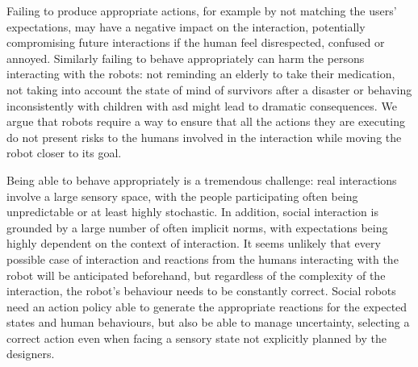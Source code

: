     Failing to produce appropriate actions, for example by not matching the users' expectations, may have a negative impact on the interaction, potentially compromising future interactions if the human feel disrespected, confused or annoyed. Similarly failing to behave appropriately can harm the persons interacting with the robots: not reminding an elderly to take their medication, not taking into account the state of mind of survivors after a disaster or behaving inconsistently with children with \gls{asd} might lead to dramatic consequences.  We argue that robots require a way to ensure that all the actions they are executing do not present risks to the humans involved in the interaction while moving the robot closer to its goal.
	
    
    Being able to behave appropriately is a tremendous challenge: real interactions involve a large sensory space, with the people participating often being unpredictable or at least highly stochastic. In addition, social interaction is grounded by a large number of often implicit norms, with expectations being highly dependent on the context of interaction. It seems unlikely that every possible case of interaction and reactions from the humans interacting with the robot will be anticipated beforehand, but regardless of the complexity of the interaction, the robot's behaviour needs to be constantly correct. Social robots need an action policy able to generate the appropriate reactions for the expected states and human behaviours, but also be able to manage uncertainty, selecting a correct action even when facing a sensory state not explicitly planned by the designers.
    
